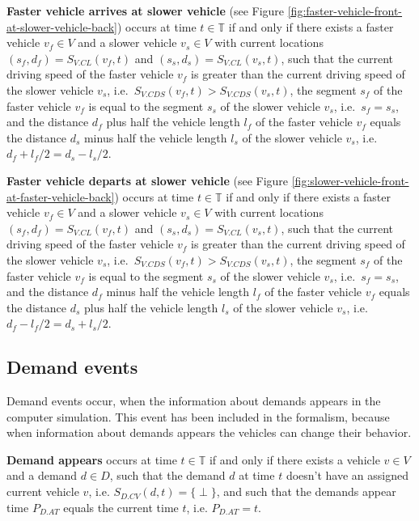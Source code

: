 \documentclass[graybox]{svmult}
\begin{document}
\noindent \textbf{Faster vehicle arrives at slower vehicle} (see Figure \ref{fig:faster-vehicle-front-at-slower-vehicle-back}) occurs at time $t \in \mathbb{T}$ if and only if there exists a faster vehicle $v_{f} \in V$ and a slower vehicle $v_{s} \in V$ with current locations $(s_f, d_f) = S_{V.CL}(v_f, t)$ and $(s_s, d_s) = S_{V.CL}(v_s, t)$, such that the current driving speed of the faster vehicle $v_f$ is greater than the current driving speed of the slower vehicle $v_s$, i.e.\ $S_{V.CDS}(v_f, t) > S_{V.CDS}(v_s, t)$, the segment $s_f$ of the faster vehicle $v_f$ is equal to the segment $s_s$ of the slower vehicle $v_s$, i.e.\ $s_f = s_s$, and the distance $d_f$ plus half the vehicle length $l_f$ of the faster vehicle $v_f$ equals the distance $d_s$ minus half the vehicle length $l_s$ of the slower vehicle $v_s$, i.e.\ $d_f + l_f / 2 = d_s - l_s / 2$.

\vspace{2mm}
\noindent \textbf{Faster vehicle departs at slower vehicle} (see Figure \ref{fig:slower-vehicle-front-at-faster-vehicle-back}) occurs at time $t \in \mathbb{T}$ if and only if there exists a faster vehicle $v_{f} \in V$ and a slower vehicle $v_{s} \in V$ with current locations $(s_f, d_f) = S_{V.CL}(v_f, t)$ and $(s_s, d_s) = S_{V.CL}(v_s, t)$, such that the current driving speed of the faster vehicle $v_f$ is greater than the current driving speed of the slower vehicle $v_s$, i.e.\ $S_{V.CDS}(v_f, t) > S_{V.CDS}(v_s, t)$, the segment $s_f$ of the faster vehicle $v_f$ is equal to the segment $s_s$ of the slower vehicle $v_s$, i.e.\ $s_f = s_s$, and the distance $d_f$ minus half the vehicle length $l_f$ of the faster vehicle $v_f$ equals the distance $d_s$ plus half the vehicle length $l_s$ of the slower vehicle $v_s$, i.e.\ $d_f - l_f / 2 = d_s + l_s / 2$.

\subsection{Demand events}
\label{sec:demand-events}

Demand events occur, when the information about demands appears in the computer simulation.
This event has been included in the formalism, because when information about demands appears the vehicles can change their behavior.

\vspace{2mm}
\noindent \textbf{Demand appears} occurs at time $t \in \mathbb{T}$ if and only if there exists a vehicle $v \in V$ and a demand $d \in D$, such that the demand $d$ at time $t$ doesn't have an assigned current vehicle $v$, i.e. $S_{D.CV}(d, t) = \{\perp\}$, and such that the demands appear time $P_{D.AT}$ equals the current time $t$, i.e. $P_{D.AT} = t$.
\end{document}
